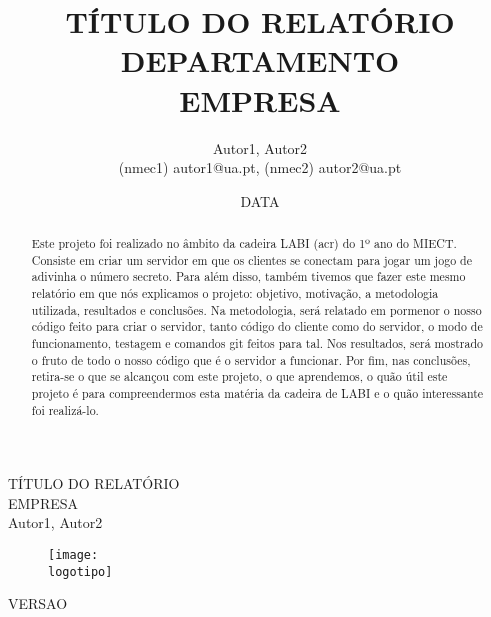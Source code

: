 \documentclass{report}
\begin{document}
%
\def\titulo{TÍTULO DO RELATÓRIO}
\def\data{DATA}
\def\autores{Autor1, Autor2}
\def\autorescontactos{(nmec1) autor1@ua.pt, (nmec2) autor2@ua.pt}
\def\versao{VERSAO}
\def\departamento{DEPARTAMENTO}
\def\empresa{EMPRESA}
\def\logotipo{ua.pdf}
%
%
\renewcommand{\contentsname}{Índice}
\begin{titlepage}

\begin{center}
%
\vspace*{50mm}
%
{\Huge \titulo}\\ 
%
\vspace{10mm}
%
{\Large \empresa}\\
%
\vspace{10mm}
%
{\LARGE \autores}\\ 
%
\vspace{30mm}
%
\begin{figure}[h]
\center
\texttt{[image: \\logotipo]}
\end{figure}
%
\vspace{30mm}
\end{center}
%
\begin{flushright}
\versao
\end{flushright}
\end{titlepage}

\title{%
{\Huge\textbf{\titulo}}\\
{\Large \departamento\\ \empresa}
}
%
\author{%
    \autores \\
    \autorescontactos
}
%
\date{\data}
%
\maketitle


\begin{abstract}
Este projeto foi realizado no âmbito da cadeira LABI (acr) do 1º ano do MIECT.
Consiste em criar um servidor em que os clientes se conectam para jogar um jogo de
adivinha o número secreto. Para além disso, também tivemos que fazer este mesmo 
relatório em que nós explicamos o projeto: objetivo, motivação, a metodologia utilizada, resultados e
conclusões. Na metodologia, será relatado em pormenor o nosso código feito para criar o servidor, tanto
código do cliente como do servidor, o modo de funcionamento, testagem e comandos git feitos para tal.
Nos resultados, será mostrado o fruto de todo o nosso código que é o servidor a funcionar.
Por fim, nas conclusões, retira-se o que se alcançou com este projeto, o que aprendemos,
o quão útil este projeto é para compreendermos esta matéria da cadeira de LABI e o 
quão interessante foi realizá-lo.
\end{abstract}
\end{document}
